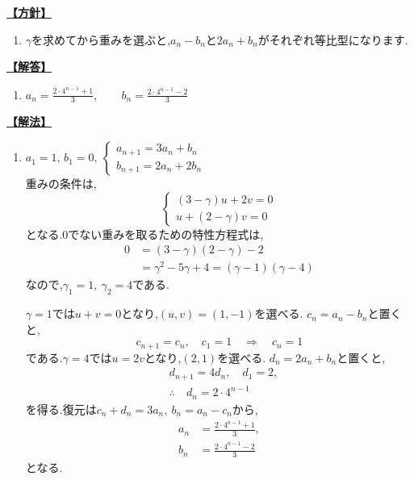 \noindent \hyperlink{book:example-system-1:answer:2}{\textbf{【方針】}}\par\nobreak
\begin{enumerate}[start=2,label=(\arabic*),parsep=3pt,format=\bookitemlink{example-system-1}{hint}{answer}]
  \item $\gamma$を求めてから重みを選ぶと,$a_n-b_n$と$2a_n+b_n$がそれぞれ等比型になります.
\end{enumerate}

\noindent \hyperlink{book:example-system-1:solution:2}{\textbf{【解答】}}\par\nobreak
\begin{enumerate}[start=2,label=(\arabic*),parsep=3pt,format=\bookitemlink{example-system-1}{answer}{solution}]
  \item $a_n=\frac{2\cdot4^{n-1}+1}{3},\qquad b_n=\frac{2\cdot4^{n-1}-2}{3}$
\end{enumerate}

\noindent \hyperlink{book:example-system-1:problem:2}{\textbf{【解法】}}\par\nobreak
\begin{enumerate}[start=2,label=(\arabic*),parsep=3pt,format=\bookitemlink{example-system-1}{solution}{problem}]
  \item $a_1=1,\,b_1=0,\ \begin{cases}a_{n+1}=3a_n+b_n\\ b_{n+1}=2a_n+2b_n\end{cases}$\\
    重みの条件は,
    \[
      \begin{cases}
        (3-\gamma)u+2v=0\\
        u+(2-\gamma)v=0
      \end{cases}
    \]
    となる.0でない重みを取るための特性方程式は,
    \begin{align*}
      0&=(3-\gamma)(2-\gamma)-2\\
      &=\gamma^2-5\gamma+4=(\gamma-1)(\gamma-4)
    \end{align*}
    なので,$\gamma_1=1,\ \gamma_2=4$である.

    $\gamma=1$では$u+v=0$となり,$(u,v)=(1,-1)$を選べる.
    $c_n=a_n-b_n$と置くと,
    \[
      c_{n+1}=c_n,\quad c_1=1
      \quad\Longrightarrow\quad c_n=1
    \]
    である.$\gamma=4$では$u=2v$となり,$(2,1)$を選べる.
    $d_n=2a_n+b_n$と置くと,
    \[
      \begin{aligned}
        &d_{n+1}=4d_n,\quad d_1=2,\\
        &\therefore\quad d_n=2\cdot4^{n-1}
      \end{aligned}
    \]
    を得る.復元は$c_n+d_n=3a_n,\ b_n=a_n-c_n$から,
    \begin{align*}
      a_n&=\frac{2\cdot4^{n-1}+1}{3},\\
      b_n&=\frac{2\cdot4^{n-1}-2}{3}
    \end{align*}
    となる.
\end{enumerate}

